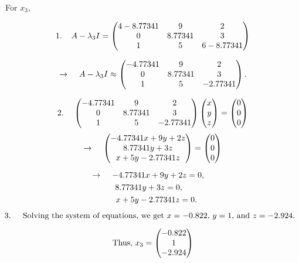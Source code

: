 \documentclass{article}
\begin{document}
\vspace{10mm}

For \( x_3 \),

\[
1. \hspace{4mm} A - \lambda_3 I = \begin{pmatrix} 4 - 8.77341 & 9 & 2 \\ 0 & 8.77341 & 3 \\ 1 & 5 & 6 - 8.77341 \end{pmatrix}
\]

\[
\rightarrow \hspace{4mm} A - \lambda_3 I \approx \begin{pmatrix} -4.77341 & 9 & 2 \\ 0 & 8.77341 & 3 \\ 1 & 5 & -2.77341 \end{pmatrix}.
\]

\vspace{2mm}

\[
2. \hspace{4mm} \begin{pmatrix} -4.77341 & 9 & 2 \\ 0 & 8.77341 & 3 \\ 1 & 5 & -2.77341 \end{pmatrix} \begin{pmatrix} x \\ y \\ z \end{pmatrix} = \begin{pmatrix} 0 \\ 0 \\ 0 \end{pmatrix}
\]
\[
\rightarrow \hspace{4mm} \begin{pmatrix} -4.77341 x + 9 y + 2 z \\ 8.77341 y + 3 z \\ x + 5 y - 2.77341 z \end{pmatrix} = \begin{pmatrix} 0 \\ 0 \\ 0 \end{pmatrix}
\]

\[
\hspace{-4mm} \rightarrow \hspace{4mm} -4.77341 x + 9 y + 2 z = 0,
\]
\[
\hspace{-2.5mm} \hspace{-1mm} 8.77341 y + 3 z = 0,
\]
\[
\hspace{-2mm} \hspace{5mm} x + 5 y - 2.77341 z = 0.
\]

\[
\text{\hspace{-4mm} 3. \hspace{2mm} Solving the system of equations, we get \( x = -0.822 \), \( y = 1 \), and \( z = -2.924 \).}
\]

\[
\text{Thus, \( x_3 = \begin{pmatrix} -0.822 \\ 1 \\ -2.924 \end{pmatrix} \)}
\]
\end{document}
